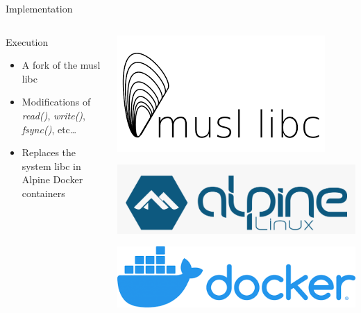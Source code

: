 \documentclass[presentation]{beamer}
\begin{document}
\begin{frame}[label={sec:org72ae849}]{Implementation}
\begin{columns}
\begin{column}{0.6\columnwidth}
\begin{block}{Execution}
\begin{itemize}
\item A fork of the musl libc\\
\item Modifications of {\color{olive}\emph{read()}}, {\color{red}\emph{write()}}, {\color{orange}\emph{fsync()}}, etc\ldots{}\\
\item Replaces the system libc in Alpine Docker containers\\
\end{itemize}
\end{block}
\end{column}

\begin{column}{0.4\columnwidth}
\begin{block}{}
\begin{center}
\includegraphics[width=.9\linewidth]{./IMGs/musl-logo.png}
\end{center}

\begin{center}
\includegraphics[width=.9\linewidth]{./IMGs/alpine-logo.png}
\end{center}

\begin{center}
\includegraphics[width=.9\linewidth]{./IMGs/docker-logo.png}
\end{center}
\end{block}
\end{column}
\end{columns}
\end{frame}
\end{document}
